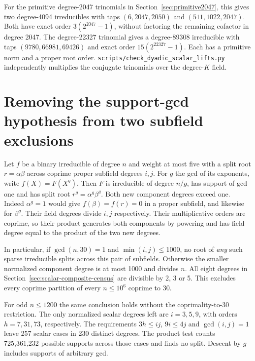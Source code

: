 \documentclass[11pt]{article}
\begin{document}
For the primitive degree-2047 trinomials in
Section~\ref{sec:primitive2047}, this gives two degree-4094
irreducibles with taps \((6,2047,2050)\) and \((511,1022,2047)\).
Both have exact order \(3(2^{2047}-1)\), without factoring the
remaining cofactor in degree 2047. The degree-22327 trinomial
gives a degree-89308 irreducible with taps \((9780,66981,69426)\)
and exact order \(15(2^{22327}-1)\).
Each has a primitive norm and a proper root order.
\nolinkurl{scripts/check_dyadic_scalar_lifts.py} independently
multiplies the conjugate trinomials over the degree-\(K\) field.

\clearpage
\section{Removing the support-gcd hypothesis from two subfield exclusions}
\label{sec:odd-scalar-descent}
Let \(f\) be a binary irreducible of degree \(n\) and weight at most
five with a split root \(r=\alpha\beta\) across coprime proper
subfield degrees \(i,j\). For \(g\) the gcd of its exponents,
write \(f(X)=F(X^g)\). Then \(F\) is irreducible of degree \(n/g\),
has support of gcd one and has split root
\(r^g=\alpha^g\beta^g\). Both new component degrees exceed one.
Indeed \(\alpha^g=1\) would give \(f(\beta)=f(r)=0\) in a proper
subfield, and likewise for \(\beta^g\). Their field degrees divide
\(i,j\) respectively. Their multiplicative orders are coprime, so
their product generates both components by powering and has field
degree equal to the product of the two new degrees.

In particular, if \(\gcd(n,30)=1\) and \(\min(i,j)\le1000\),
no root of \emph{any} such sparse irreducible splits across this pair
of subfields.
Otherwise the smaller normalized component degree is at most 1000
and divides \(n\). All eight degrees in
Section~\ref{sec:scalar-composite-census} are divisible by 2, 3 or 5.
This excludes every coprime partition of every \(n\le10^6\)
coprime to 30.

For odd \(n\le1200\) the same conclusion holds without the
coprimality-to-30 restriction. The only normalized scalar degrees
left are \(i=3,5,9\), with orders \(h=7,31,73\), respectively.
The requirements \(3h\le ij\), \(9i\le4j\) and \(\gcd(i,j)=1\)
leave 257 scalar cases in 230 distinct degrees. The product test
counts 725,361,232 possible supports across those cases and finds
no split. Descent by \(g\) includes supports of arbitrary gcd.
\end{document}

